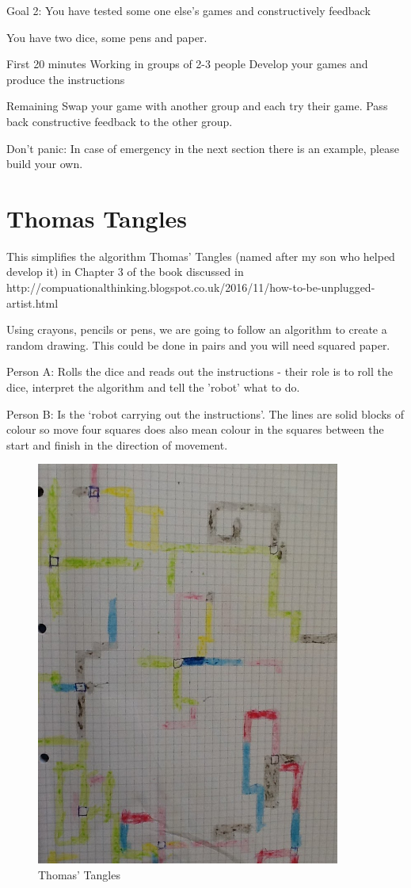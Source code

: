 Goal 2: You have tested some one else's games and constructively feedback 

You have two dice, some pens and paper.

First 20 minutes
Working in groups of 2-3 people
Develop your games and produce the instructions

Remaining 
Swap your game with another group and each try their game.
Pass back constructive feedback to the other group.

Don't panic: In case of emergency in the next section there is an example, please build your own.


\section{Thomas Tangles}
This simplifies the algorithm Thomas' Tangles (named after my son who helped develop it) in Chapter 3 of the book discussed in http://compuationalthinking.blogspot.co.uk/2016/11/how-to-be-unplugged-artist.html

Using crayons, pencils or pens, we are going to follow an algorithm to create a random drawing. This could be done in pairs and you will need squared paper. 

Person A: Rolls the dice and reads out the instructions - their role is to roll the dice, interpret the algorithm and tell the 'robot' what to do.

Person B: Is the ‘robot carrying out the instructions'. The lines are solid blocks of colour so move four squares does also mean colour in the squares between the start and finish in the direction of movement.

\begin{figure}
    \centering
    \includegraphics[width=10cm]{chapters/chapterCT1/figures/tt1.JPG}
    \caption{Thomas' Tangles}
    \label{fig:ThomasTangles1}
\end{figure}

